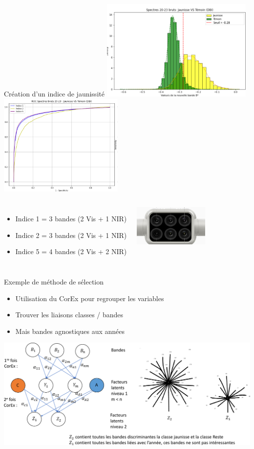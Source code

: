 \documentclass[presentation, aspectratio=169]{beamer}
\begin{document}
\begin{frame}{Création d'un indice de jaunissité}
  \includegraphics[height=5cm]{jaunisse-temoin-hist}
  \hfill
  \includegraphics[height=5cm]{jaunisse-temoin-roc}
  \begin{columns}
    \begin{itemize}
    \item Indice 1 = 3 bandes (2 Vis + 1 NIR)
    \item Indice 2 = 3 bandes (2 Vis + 1 NIR)
    \item Indice 5 = 4 bandes (2 Vis + 2 NIR)
    \end{itemize}
    \centering
    \includegraphics[height=2cm]{camera}
  \end{columns}
\end{frame}

\begin{frame}{Exemple de méthode de sélection}
  \begin{itemize}
  \item Utilisation du CorEx pour regrouper les variables
  \item Trouver les liaisons classes / bandes
  \item Mais bandes agnostiques aux années
  \end{itemize}
  \begin{center}
    \includegraphics[width=.9\textwidth]{corex}
  \end{center}
\end{frame}
\end{document}
